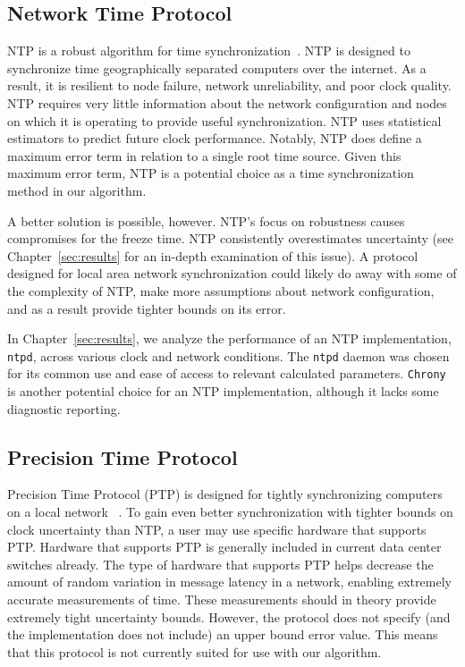\subsection{Network Time Protocol}

NTP is a robust algorithm for time
synchronization~\citep{Burbank2010}. NTP is designed to
synchronize time geographically separated computers over the internet. As a
result, it is resilient to node failure, network unreliability, and
poor clock quality. NTP requires very little information about the
network configuration and nodes on which it is operating to provide useful
synchronization. NTP uses statistical estimators to predict
future clock performance. Notably, NTP does define a maximum error
term in relation to a single root time source. Given this maximum error 
term, NTP is a potential choice as a time synchronization method in 
our algorithm.

A better solution is possible, however. NTP's focus on robustness
causes compromises for the freeze time. NTP consistently overestimates
uncertainty (see Chapter~\ref{sec:results} for an in-depth 
examination of this issue). A protocol designed for local area network
synchronization could likely do away with some of the complexity of
NTP, make more assumptions about network configuration, and as a
result provide tighter bounds on its error.

In Chapter~\ref{sec:results}, we analyze the
performance of an NTP implementation, \texttt{ntpd}, across various clock and
network conditions. The \texttt{ntpd} daemon was chosen for its common use and
ease of access to relevant calculated parameters. \texttt{Chrony} is another
potential choice for an NTP implementation, although it lacks some
diagnostic reporting. %

\subsection{Precision Time Protocol}

Precision Time Protocol (PTP) is designed for 
tightly synchronizing computers on a local network
~\citeyearpar{2008}. To gain even better 
synchronization with tighter bounds on clock uncertainty than NTP, 
a user may use specific hardware that supports PTP. Hardware that supports
PTP is generally included in current data center switches already. The type
of hardware that supports PTP helps decrease the amount of random variation in
message latency in a network, enabling extremely accurate measurements of time.
These measurements should in theory provide extremely tight uncertainty
bounds. However, the protocol does not specify (and the implementation
does not include) an upper bound error value. This means that this
protocol is not currently suited for use with our algorithm.

